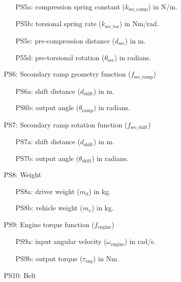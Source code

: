 \documentclass[12pt]{article}
\begin{document}
\begin{itemize}
\begin{itemize}
  \item [PS5a:] compression spring constant ($k_{\text{sec\_comp}}$) in N/m.
  \item [PS5b:] torsional spring rate ($k_{\text{sec\_tor}}$) in Nm/rad.
  \item [PS5c:] pre-compression distance ($d_{\text{sec}}$) in m.
  \item [P55d:] pre-torsional rotation ($\theta_{\text{sec}}$) in radians.
\end{itemize}

\item[PS6:] Secondary ramp geometry function ($f_{\text{sec\_ramp}}$)

\begin{itemize}
  \item [PS6a:] shift distance ($d_{\text{shift}}$) in m.
  \item [PS6b:] output angle ($\theta_{\text{ramp}}$) in radians.
\end{itemize}

\item[PS7:] Secondary ramp rotation function ($f_{\text{sec\_shift}}$)

\begin{itemize}
  \item [PS7a:] shift distance ($d_{\text{shift}}$) in m.
  \item [PS7b:] output angle ($\theta_{\text{shift}}$) in radians.
\end{itemize}

\item[PS8:] Weight

\begin{itemize}
  \item [PS8a:] driver weight ($m_{\text{d}}$) in kg.
  \item [PS8b:] vehicle weight ($m_{\text{v}}$) in kg.
\end{itemize}

\item[PS9:] Engine torque function ($f_{\text{engine}}$)

\begin{itemize}
  \item [PS9a:] input angular velocity ($\omega_{\text{engine}}$) in rad/s.
  \item [PS9b:] output torque ($\tau_{\text{eng}}$) in Nm.
\end{itemize}

\item[PS10:] Belt


\end{itemize}
\end{document}
